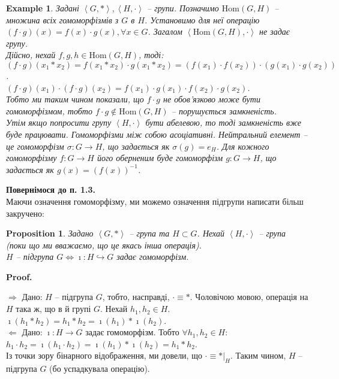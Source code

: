 \documentclass[a4paper, 10pt]{article}
\makeatletter
\def\rightproof{$\boxed{\Rightarrow}$ }
\def\leftproof{$\boxed{\Leftarrow}$ }
\theoremstyle{theoremdd}
\theoremstyle{theoremdd}
\theoremstyle{theoremdd}
\theoremstyle{theoremdd}
\theoremstyle{theoremdd}
\newtheorem{example}[theorem]{Example}
\theoremstyle{theoremdd}
\theoremstyle{theoremdd}
\theoremstyle{theoremdd}
\theoremstyle{theoremdd}
\newtheorem{proposition}[theorem]{Proposition}
\theoremstyle{theoremdd}
\theoremstyle{theoremdd}
\theoremstyle{theoremdd}
\theoremstyle{theoremdd}
\theoremstyle{theoremdd}
\theoremstyle{theoremdd}
\renewenvironment{proof}[1][Proof.\\]{\par
\pushQED{\hfill \qed}%
\normalfont \topsep6\p@\@plus6\p@\relax
\trivlist
\item\relax
{\bfseries
#1\@addpunct{.}}\hspace\labelsep\ignorespaces
}{%
\popQED\endtrivlist\@endpefalse
}
\newcommand\homom[2]{\text{Hom}({#1},{#2})}
\makeatother
\begin{document}
\begin{example}
Задані $\left< G, * \right>, \left< H, \cdot \right>$ -- групи. Позначимо $\homom{G}{H}$ -- множина всіх гомоморфізмів з $G$ в $H$. Установимо для неї операцію $(f \cdot g)(x) = f(x) \cdot g(x), \forall x \in G$. Загалом $\left< \homom{G}{H}, \cdot \right>$ не задає групу.\\
Дійсно, нехай $f,g,h \in \homom{G}{H}$, тоді:\\
$(f \cdot g)(x_1 * x_2) = f(x_1 * x_2) \cdot g(x_1 * x_2) = (f(x_1) \cdot f(x_2)) \cdot (g(x_1) \cdot g(x_2))$.\\
$(f \cdot g)(x_1) \cdot (f \cdot g)(x_2) = f(x_1) \cdot g(x_1) \cdot f(x_2) \cdot g(x_2)$.\\
Тобто ми таким чином показали, що $f \cdot g$ не обов'язково може бути гомоморфізмом, тобто $f \cdot g \notin \homom{G}{H}$ -- порушується замкненість.\\
Утім якщо попросити групу $\left< H,\cdot \right>$ бути абелевою, то тоді замкненість вже буде працювати. Гомоморфізми між собою асоціативні. Нейтральний елемент -- це гомоморфізм $\sigma \colon G \to H$, що задається як $\sigma(g) = e_H$. Для кожного гомоморфізму $f \colon G \to H$ його оберненим буде гомоморфізм $g \colon G \to H$, що задається як $g(x) = (f(x))^{-1}$.
\end{example}

\textbf{Повернімося до п. 1.3.}\\
Маючи означення гомоморфізму, ми можемо означення підгрупи написати більш закручено:
\begin{proposition}
Задано $\left< G,*\right>$ -- група та $H \subset G$. Нехай $\left<H,\cdot\right>$ -- група (поки що ми вважаємо, що це якась інша операція).\\
$H$ -- підгрупа $G \iff \imath \colon H \hookrightarrow G$ задає гомоморфізм.
\end{proposition}

\begin{proof}
\rightproof Дано: $H$ -- підгрупа $G$, тобто, насправді, $\cdot \equiv *$. Чоловічою мовою, операція на $H$ така ж, що в й групі $G$. Нехай $h_1,h_2 \in H$.\\
$\imath (h_1 * h_2) = h_1 * h_2 = \imath(h_1) * \imath(h_2)$.
\bigskip \\
\leftproof Дано: $\imath \colon H \to G$ задає гомоморфізм. Тобто $\forall h_1,h_2 \in H:$\\
$h_1 \cdot h_2 = \imath(h_1 \cdot h_2) = \imath(h_1) * \imath(h_2) = h_1 * h_2$.\\
Із точки зору бінарного відображення, ми довели, що $\cdot \equiv *|_H$. Таким чином, $H$ -- підгрупа $G$ (бо успадкувала операцію).
\end{proof}
\end{document}
